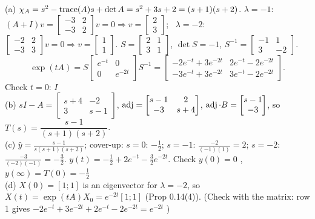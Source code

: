 \begin{solbox}[title={M2 solutions}]
(a) $\chi_A=s^2-\operatorname{trace}(A)s+\det A=s^2+3s+2=(s+1)(s+2)$.
$\lambda=-1$: $(A+I)v=\begin{bmatrix}-3&2\\-3&2\end{bmatrix}v=0\Rightarrow v=\begin{bmatrix}2\\3\end{bmatrix}$; \ $\lambda=-2$: $\begin{bmatrix}-2&2\\-3&3\end{bmatrix}v=0\Rightarrow v=\begin{bmatrix}1\\1\end{bmatrix}$.
$S=\begin{bmatrix}2&1\\3&1\end{bmatrix}$, $\det S=-1$, $S^{-1}=\begin{bmatrix}-1&1\\3&-2\end{bmatrix}$.
\[\exp(tA)=S\begin{bmatrix}e^{-t}&0\\0&e^{-2t}\end{bmatrix}S^{-1}=\begin{bmatrix}-2e^{-t}+3e^{-2t}&2e^{-t}-2e^{-2t}\\-3e^{-t}+3e^{-2t}&3e^{-t}-2e^{-2t}\end{bmatrix}.\]
Check $t=0$: $I$ \checkmark\\[1mm]
(b) $sI-A=\begin{bmatrix}s+4&-2\\3&s-1\end{bmatrix}$, $\operatorname{adj}=\begin{bmatrix}s-1&2\\-3&s+4\end{bmatrix}$, $\operatorname{adj}\cdot B=\begin{bmatrix}s-1\\-3\end{bmatrix}$, so $T(s)=\dfrac{s-1}{(s+1)(s+2)}$.\\[1mm]
(c) $\hat y=\frac{s-1}{s(s+1)(s+2)}$; cover-up: $s=0$: $-\frac12$; $s=-1$: $\frac{-2}{(-1)(1)}=2$; $s=-2$: $\frac{-3}{(-2)(-1)}=-\frac32$.
$y(t)=-\frac12+2e^{-t}-\frac32e^{-2t}$. Check $y(0)=0$ \checkmark, $y(\infty)=T(0)=-\frac12$ \checkmark\\[1mm]
(d) $X(0)=[1;1]$ is an eigenvector for $\lambda=-2$, so $X(t)=\exp(tA)X_0=e^{-2t}[1;1]$ (Prop 0.14(4)). (Check with the matrix: row 1 gives $-2e^{-t}+3e^{-2t}+2e^{-t}-2e^{-2t}=e^{-2t}$ \checkmark)
\end{solbox}
